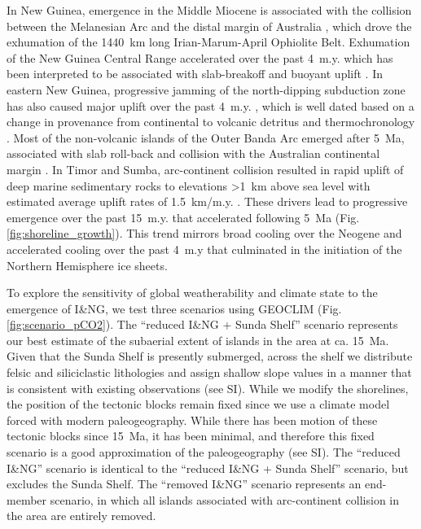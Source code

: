 \documentclass[11pt,letterpaper]{article}
\begin{document}
In New Guinea, emergence in the Middle Miocene is associated with the collision between the Melanesian Arc and the distal margin of Australia \citep{vanUfford2005a, Cloos2005a, Baldwin2012a}, which drove the exhumation of the 1440~km long Irian-Marum-April Ophiolite Belt. Exhumation of the New Guinea Central Range accelerated over the past 4~m.y. which has been interpreted to be associated with slab-breakoff and buoyant uplift \citep{Cloos2005a}. In eastern New Guinea, progressive jamming of the north-dipping subduction zone has also caused major uplift over the past 4~m.y. \citep{vanUfford2005a}, which is well dated based on a change in provenance from continental to volcanic detritus \citep{Abbott1994a} and thermochronology \citep{Hill1989a}. Most of the non-volcanic islands of the Outer Banda Arc emerged after 5~Ma, associated with slab roll-back and collision with the Australian continental margin \citep{Harris2006a, Hall2013b}. In Timor and Sumba, arc-continent collision resulted in rapid uplift of deep marine sedimentary rocks to elevations \textgreater1~km above sea level with estimated average uplift rates of 1.5~km/m.y. \citep{AudleyCharles1986a}. These drivers lead to progressive emergence over the past 15~m.y. that accelerated following 5~Ma (Fig. \ref{fig:shoreline_growth}). This trend mirrors broad cooling over the Neogene and accelerated cooling over the past 4~m.y that culminated in the initiation of the Northern Hemisphere ice sheets.

To explore the sensitivity of global weatherability and climate state to the emergence of I\&NG, we test three scenarios using GEOCLIM (Fig. \ref{fig:scenario_pCO2}). The ``reduced I\&NG + Sunda Shelf'' scenario represents our best estimate of the subaerial extent of islands in the area at ca. 15~Ma. Given that the Sunda Shelf is presently submerged, across the shelf we distribute felsic and siliciclastic lithologies and assign shallow slope values in a manner that is consistent with existing observations (see SI). While we modify the shorelines, the position of the tectonic blocks remain fixed since we use a climate model forced with modern paleogeography. While there has been motion of these tectonic blocks since 15~Ma, it has been minimal, and therefore this fixed scenario is a good approximation of the paleogeography (see SI). The ``reduced I\&NG'' scenario is identical to the ``reduced I\&NG + Sunda Shelf'' scenario, but excludes the Sunda Shelf. The ``removed I\&NG'' scenario represents an end-member scenario, in which all islands associated with arc-continent collision in the area are entirely removed.
\end{document}
